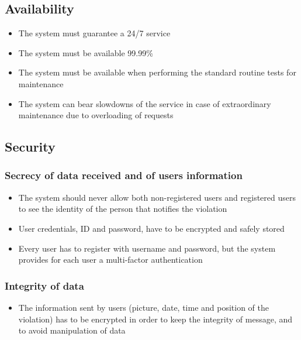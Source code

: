 \subsection{Availability}
\begin{itemize}
    \item The system must guarantee a 24/7 service
    \item The system must be available 99.99\%
    \item The system must be available when performing the standard routine tests for maintenance
    \item The system can bear slowdowns of the service in case of extraordinary maintenance due to overloading of requests
\end{itemize}

\subsection{Security}
\subsubsection{Secrecy of data received and of users information}
\begin{itemize}
    \item The system should never allow both non-registered users and registered users to see the identity of the person that notifies the violation
    \item User credentials, ID and password, have to be encrypted and safely stored
    \item Every user has to register with username and password, but the system provides for each user a multi-factor authentication
\end{itemize}

\subsubsection{Integrity of data}
\begin{itemize}
    \item The information sent by users (picture, date, time and position of the violation) has to be encrypted in order to keep the integrity of message, and to avoid manipulation of data
\end{itemize}

